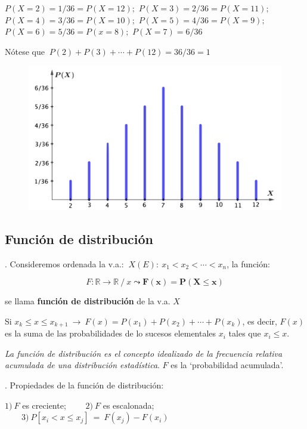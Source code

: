\begin{example}
$P(X=2)=1/36=P(X=12);$ $P(X=3)=2/36=P(X=11);$ $P(X=4)=3/36=P(X=10);$ $P(X=5)=4/36=P(X=9);$ $P(X=6)=5/36=P(x=8);$ $P(X=7)=6/36$

\vspace{2mm} Nótese que $\ P(2)+P(3)+ \cdots + P(12)=36/36=1$

	\begin{figure}[H]
	\centering
	\includegraphics[width=.7\textwidth]{imagenes/imagenes04/T04IM03.png}
	\end{figure}
\end{example}

\subsection{Función de distribución}

\begin{definition}
.	Consideremos ordenada la v.a.: $\ X(E):\ x_1<x_2< \cdots <x_n$, la función: 

 $$F:\mathbb R \to \mathbb R \ / \ x \leadsto \boldsymbol{ F(x)=P(X\le x) }$$ 
 
 se llama \textbf{función de distribución} de la v.a. $X$ 	

\vspace{2mm} Si $x_k\le x\le x_{k+1} \ \to \ F(x)=P(x_1)+P(x_2)+ \cdots + P(x_k)$, es decir, $F(x)$ es la suma de las probabilidades de lo sucesos elementales $x_i$ tales que $x_i\le x$. 

\vspace{2mm} \emph{La función de distribución es el concepto idealizado de la frecuencia relativa acumulada de una distribución estadística}. $F$ es la `probabilidad acumulada'.
\end{definition}

\vspace{1cm}%
\begin{theorem}
.	Propiedades de la función de distribución:

	 $1)\ F$ es creciente; 
	 $\qquad 2)\ F$ es escalonada;
	$\qquad 3)\ P[x_i < x \le x_j]\ = \ F(x_j)-F(x_i)$	
	
\end{theorem}


